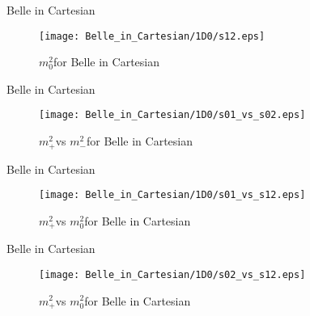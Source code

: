 \documentclass{beamer}
\newcommand{\MP}{\ensuremath{m^2_+}}
\newcommand{\MM}{\ensuremath{m^2_-}}
\newcommand{\MZ}{\ensuremath{m^2_0}}
\begin{document}
\begin{frame}{Belle in Cartesian}
\begin{figure}
\texttt{[image: Belle\_in\_Cartesian/1D0/s12.eps]}
\caption{\MZ for Belle in Cartesian}
\end{figure}
\end{frame}
\begin{frame}{Belle in Cartesian}
\begin{figure}
\texttt{[image: Belle\_in\_Cartesian/1D0/s01\_vs\_s02.eps]}
\caption{\MP vs \MM for Belle in Cartesian}
\end{figure}
\end{frame}
\begin{frame}{Belle in Cartesian}
\begin{figure}
\texttt{[image: Belle\_in\_Cartesian/1D0/s01\_vs\_s12.eps]}
\caption{\MP vs \MZ for Belle in Cartesian}
\end{figure}
\end{frame}
\begin{frame}{Belle in Cartesian}
\begin{figure}
\texttt{[image: Belle\_in\_Cartesian/1D0/s02\_vs\_s12.eps]}
\caption{\MP vs \MZ for Belle in Cartesian}
\end{figure}
\end{frame}
\end{document}
